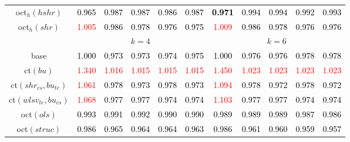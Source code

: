 \begin{tabular}[t]{c|>{}cccc>{}c|ccccc}
oct$_h(hshr)$ & \textcolor{black}{0.965} & \textcolor{black}{0.987} & \textcolor{black}{0.987} & \textcolor{black}{0.986} & \textcolor{black}{0.987} & \textcolor{black}{\textbf{0.971}} & \textcolor{black}{0.994} & \textcolor{black}{0.994} & \textcolor{black}{0.992} & \textcolor{black}{0.993}\\
oct$_h(shr)$ & \textcolor{red}{1.005} & \textcolor{black}{0.986} & \textcolor{black}{0.978} & \textcolor{black}{0.976} & \textcolor{black}{0.975} & \textcolor{red}{1.009} & \textcolor{black}{0.986} & \textcolor{black}{0.978} & \textcolor{black}{0.976} & \textcolor{black}{0.976}\\
\addlinespace[0.3em]
\multicolumn{1}{c}{} & \multicolumn{5}{c}{\textbf{$k = 4$}} & \multicolumn{5}{c}{\textbf{$k = 6$}}\\
base & \textcolor{black}{1.000} & \textcolor{black}{0.973} & \textcolor{black}{0.973} & \textcolor{black}{0.974} & \textcolor{black}{0.975} & \textcolor{black}{1.000} & \textcolor{black}{0.976} & \textcolor{black}{0.976} & \textcolor{black}{0.978} & \textcolor{black}{0.978}\\
ct$(bu)$ & \textcolor{red}{1.340} & \textcolor{red}{1.016} & \textcolor{red}{1.015} & \textcolor{red}{1.015} & \textcolor{red}{1.015} & \textcolor{red}{1.450} & \textcolor{red}{1.023} & \textcolor{red}{1.023} & \textcolor{red}{1.023} & \textcolor{red}{1.023}\\
ct$(shr_{cs}, bu_{te})$ & \textcolor{red}{1.061} & \textcolor{black}{0.978} & \textcolor{black}{0.973} & \textcolor{black}{0.978} & \textcolor{black}{0.973} & \textcolor{red}{1.094} & \textcolor{black}{0.978} & \textcolor{black}{0.972} & \textcolor{black}{0.978} & \textcolor{black}{0.972}\\
ct$(wlsv_{te}, bu_{cs})$ & \textcolor{red}{1.068} & \textcolor{black}{0.977} & \textcolor{black}{0.977} & \textcolor{black}{0.974} & \textcolor{black}{0.974} & \textcolor{red}{1.103} & \textcolor{black}{0.977} & \textcolor{black}{0.977} & \textcolor{black}{0.974} & \textcolor{black}{0.974}\\
oct$(ols)$ & \textcolor{black}{0.993} & \textcolor{black}{0.991} & \textcolor{black}{0.992} & \textcolor{black}{0.990} & \textcolor{black}{0.990} & \textcolor{black}{0.989} & \textcolor{black}{0.989} & \textcolor{black}{0.989} & \textcolor{black}{0.987} & \textcolor{black}{0.986}\\
oct$(struc)$ & \textcolor{black}{0.986} & \textcolor{black}{0.965} & \textcolor{black}{0.964} & \textcolor{black}{0.964} & \textcolor{black}{0.963} & \textcolor{black}{0.986} & \textcolor{black}{0.961} & \textcolor{black}{0.960} & \textcolor{black}{0.959} & \textcolor{black}{0.957}\\

\end{tabular}

